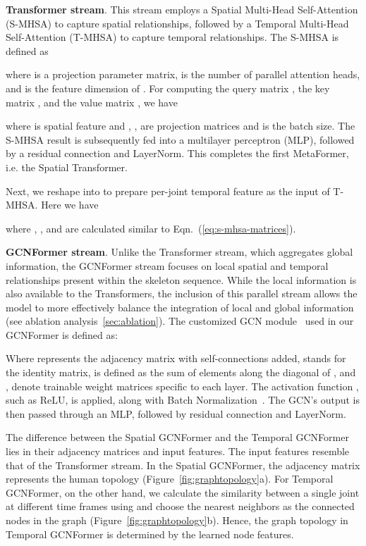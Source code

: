 \documentclass[10pt,twocolumn,letterpaper]{article}
\begin{document}
    \textbf{Transformer stream}. This stream employs a Spatial Multi-Head Self-Attention (S-MHSA) to capture spatial relationships, followed by a Temporal Multi-Head Self-Attention (T-MHSA) to capture temporal relationships. The S-MHSA is defined as
    
    where  is a projection parameter matrix,  is the number of parallel attention heads, and  is the feature dimension of . For computing the query matrix , the key matrix , and the value matrix , we have
    
    where   is spatial feature and , ,  are projection matrices and  is the batch size. The S-MHSA result is subsequently fed into a multilayer perceptron (MLP), followed by a residual connection and LayerNorm. This completes the first MetaFormer, i.e. the Spatial Transformer. 
    
    Next, we reshape  into  to prepare per-joint temporal feature as the input of T-MHSA. Here we have
    
    where , , and  are calculated similar to Eqn.~(\ref{eq:s-mhsa-matrices}).
    
    \textbf{GCNFormer stream}. Unlike the Transformer stream, which aggregates global information, the GCNFormer stream focuses on local spatial and temporal relationships present within the skeleton sequence. While the local information is also available to the Transformers, the inclusion of this parallel stream allows the model to more effectively balance the integration of local and global information (see ablation analysis~\ref{sec:ablation}). The customized GCN module~\cite{luo2022learning} used in our GCNFormer is defined as:
    
    Where  represents the adjacency matrix with self-connections added,  stands for the identity matrix,  is defined as the sum of elements along the diagonal of , and ,  denote trainable weight matrices specific to each layer. The activation function , such as ReLU, is applied, along with Batch Normalization~\cite{ioffe2015batch}. The GCN's output is then passed through an MLP, followed by residual connection and LayerNorm.
    
    The difference between the Spatial GCNFormer and the Temporal GCNFormer lies in their adjacency matrices and input features. The input features resemble that of the Transformer stream. In the Spatial GCNFormer, the adjacency matrix represents the human topology (Figure~\ref{fig:graphtopology}a). For Temporal GCNFormer, on the other hand, we calculate the similarity between a single joint at different time frames using 
     and choose the  nearest neighbors as the connected nodes in the graph (Figure~\ref{fig:graphtopology}b). Hence, the graph topology in Temporal GCNFormer is determined by the learned node features.
    
\end{document}
